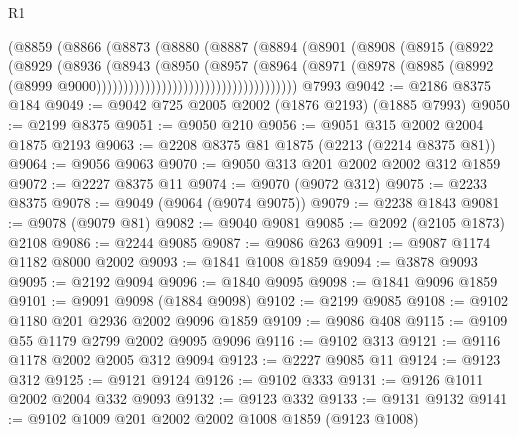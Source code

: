 \begin{lexlean}{R1}
\begin{coremodule}
                                    (@8859
                                      (@8866
                                        (@8873
                                          (@8880
                                            (@8887
                                              (@8894
                                                (@8901
                                                  (@8908
                                                    (@8915
                                                      (@8922
                                                        (@8929
                                                          (@8936
                                                            (@8943
                                                              (@8950
                                                                (@8957
                                                                  (@8964
                                                                    (@8971
                                                                      (@8978
                                                                        (@8985
                                                                          (@8992
                                                                            (@8999
                                                                              @9000)))))))))))))))))))))))))))))))))))))
    @7993
@9042 := @2186 @8375 @184
@9049 := @9042 @725 @2005 @2002 (@1876 @2193) (@1885 @7993)
@9050 := @2199 @8375
@9051 := @9050 @210
@9056 := @9051 @315 @2002 @2004 @1875 @2193
@9063 := @2208 @8375 @81 @1875 (@2213 (@2214 @8375 @81))
@9064 := @9056 @9063
@9070 := @9050 @313 @201 @2002 @2002 @312 @1859
@9072 := @2227 @8375 @11
@9074 := @9070 (@9072 @312)
@9075 := @2233 @8375
@9078 := @9049 (@9064 (@9074 @9075))
@9079 := @2238 @1843
@9081 := @9078 (@9079 @81)
@9082 := @9040 @9081
@9085 := @2092 (@2105 @1873) @2108
@9086 := @2244 @9085
@9087 := @9086 @263
@9091 := @9087 @1174 @1182 @8000 @2002
@9093 := @1841 @1008 @1859
@9094 := @3878 @9093
@9095 := @2192 @9094
@9096 := @1840 @9095
@9098 := @1841 @9096 @1859
@9101 := @9091 @9098 (@1884 @9098)
@9102 := @2199 @9085
@9108 := @9102 @1180 @201 @2936 @2002 @9096 @1859
@9109 := @9086 @408
@9115 := @9109 @55 @1179 @2799 @2002 @9095 @9096
@9116 := @9102 @313
@9121 := @9116 @1178 @2002 @2005 @312 @9094
@9123 := @2227 @9085 @11
@9124 := @9123 @312
@9125 := @9121 @9124
@9126 := @9102 @333
@9131 := @9126 @1011 @2002 @2004 @332 @9093
@9132 := @9123 @332
@9133 := @9131 @9132
@9141 := @9102 @1009 @201 @2002 @2002 @1008 @1859 (@9123 @1008)

\end{coremodule}
\end{lexlean}
